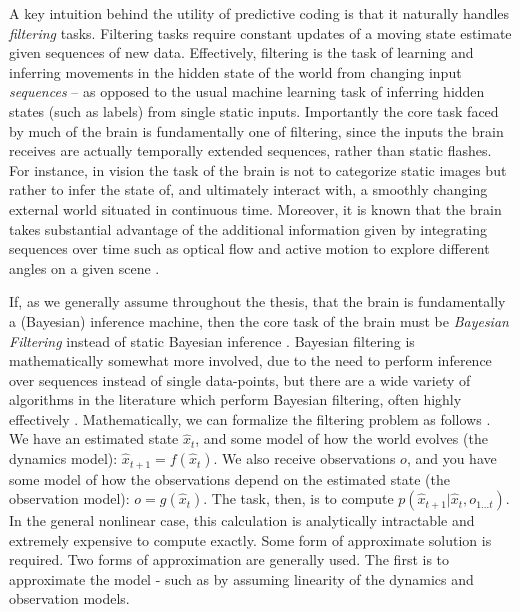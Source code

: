 A key intuition behind the utility of predictive coding is that it naturally handles \emph{filtering} tasks. Filtering tasks require constant updates of a moving state estimate given sequences of new data. Effectively, filtering is the task of learning and inferring movements in the hidden state of the world from changing input \emph{sequences} -- as opposed to the usual machine learning task of inferring hidden states (such as labels) from single static inputs. Importantly the core task faced by much of the brain is fundamentally one of filtering, since the inputs the brain receives are actually temporally extended sequences, rather than static flashes. For instance, in vision the task of the brain is not to categorize static images but rather to infer the state of, and ultimately interact with, a smoothly changing external world situated in continuous time. Moreover, it is known that the brain takes substantial advantage of the additional information given by integrating sequences over time such as optical flow \citep{gibson2002theory} and active motion to explore different angles on a given scene \citep{henderson2017gaze}.

If, as we generally assume throughout the thesis, that the brain is fundamentally a (Bayesian) inference machine, then the core task of the brain must be \emph{Bayesian Filtering} instead of static Bayesian inference \citep{sarkka2013Bayesian}. Bayesian filtering is mathematically somewhat more involved, due to the need to perform inference over sequences instead of single data-points, but there are a wide variety of algorithms in the literature which perform Bayesian filtering, often highly effectively \citep{kutschireiter2018nonlinear,kutschireiter2020hitchhiker}. Mathematically, we can formalize the filtering problem as follows \citep*{jaswinskistochastic,stengel1994optimal}. We have an estimated state $\hat{x}_t$, and some model of how the world evolves (the dynamics model): $\hat{x}_{t+1} = f(\hat{x}_t)$. We also receive observations $o$, and you have some model of how the observations depend on the estimated state (the observation model): $o = g(\hat{x}_t)$. The task, then, is to compute $p(\hat{x}_{t+1} | \hat{x}_t, o_{1...t})$. In the general nonlinear case, this calculation is analytically intractable and extremely expensive to compute exactly. Some form of approximate solution is required. Two forms of approximation are generally used. The first is to approximate the model - such as by assuming linearity of the dynamics and observation models. 

